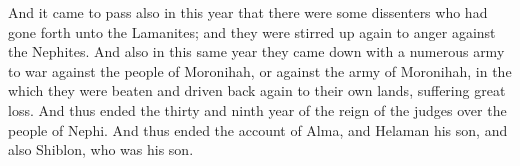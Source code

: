 \bverse \iffalse And it came to pass also in this year that there were some dissenters who had gone forth unto the Lamanites; and they were stirred up again to anger against the Nephites. \fi
And it came to pass also in this year that there were some dissenters who had gone forth unto the Lamanites; and they were stirred up again to anger against the Nephites.
\bverse \iffalse And also in this same year they came down with a numerous army to war against the people of Moronihah, or against the army of Moronihah, in the which they were beaten and driven back again to their own lands, suffering great loss. \fi
And also in this same year they came down with a numerous army to war against the people of Moronihah, or against the army of Moronihah, in the which they were beaten and driven back again to their own lands, suffering great loss.
\bverse \iffalse And thus ended the thirty and ninth year of the reign of the judges over the people of Nephi. \fi
And thus ended the thirty and ninth year of the reign of the judges over the people of Nephi.
\bverse \iffalse And thus ended the account of Alma, and Helaman his son, and also Shiblon, who was his son. \fi
And thus ended the account of Alma, and Helaman his son, and also Shiblon, who was his son.




